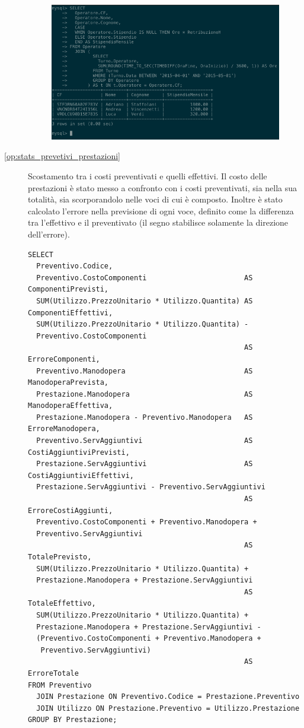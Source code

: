 \begin{description}
              \begin{figure}[H]
                \centering
                \includegraphics[width=12cm]{images/screenshots/calc_stipendio_operatore.png}
              \end{figure}

            \item[\ref{op:stats_prevetivi_prestazioni}] Scostamento tra i costi preventivati e quelli effettivi. Il costo delle prestazioni è stato messo a confronto con i costi preventivati, sia nella sua totalità, sia scorporandolo nelle voci di cui è composto. Inoltre è stato calcolato l'errore nella previsione di ogni voce, definito come la differenza tra l'effettivo e il preventivato (il segno stabilisce solamente la direzione dell'errore).

              \begin{lstlisting}
SELECT
  Preventivo.Codice,
  Preventivo.CostoComponenti                       AS ComponentiPrevisti,
  SUM(Utilizzo.PrezzoUnitario * Utilizzo.Quantita) AS ComponentiEffettivi,
  SUM(Utilizzo.PrezzoUnitario * Utilizzo.Quantita) -
  Preventivo.CostoComponenti
                                                   AS ErroreComponenti,
  Preventivo.Manodopera                            AS ManodoperaPrevista,
  Prestazione.Manodopera                           AS ManodoperaEffettiva,
  Prestazione.Manodopera - Preventivo.Manodopera   AS ErroreManodopera,
  Preventivo.ServAggiuntivi                        AS CostiAggiuntiviPrevisti,
  Prestazione.ServAggiuntivi                       AS CostiAggiuntiviEffettivi,
  Prestazione.ServAggiuntivi - Preventivo.ServAggiuntivi
                                                   AS ErroreCostiAggiunti,
  Preventivo.CostoComponenti + Preventivo.Manodopera +
  Preventivo.ServAggiuntivi
                                                   AS TotalePrevisto,
  SUM(Utilizzo.PrezzoUnitario * Utilizzo.Quantita) +
  Prestazione.Manodopera + Prestazione.ServAggiuntivi
                                                   AS TotaleEffettivo,
  SUM(Utilizzo.PrezzoUnitario * Utilizzo.Quantita) +
  Prestazione.Manodopera + Prestazione.ServAggiuntivi -
  (Preventivo.CostoComponenti + Preventivo.Manodopera +
   Preventivo.ServAggiuntivi)
                                                   AS ErroreTotale
FROM Preventivo
  JOIN Prestazione ON Preventivo.Codice = Prestazione.Preventivo
  JOIN Utilizzo ON Prestazione.Preventivo = Utilizzo.Prestazione
GROUP BY Prestazione;
              \end{lstlisting}


\end{description}

